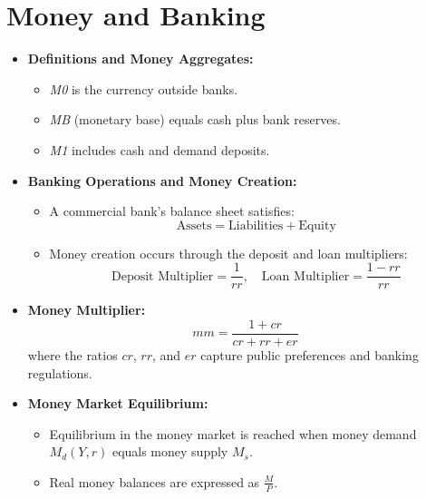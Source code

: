 \section*{Money and Banking}
\begin{itemize}
    \item \textbf{Definitions and Money Aggregates:}
    \begin{itemize}
        \item \emph{M0} is the currency outside banks.
        \item \emph{MB} (monetary base) equals cash plus bank reserves.
        \item \emph{M1} includes cash and demand deposits.
    \end{itemize}
    \item \textbf{Banking Operations and Money Creation:}
    \begin{itemize}
        \item A commercial bank’s balance sheet satisfies:
        \[
        \text{Assets} = \text{Liabilities} + \text{Equity}
        \]
        \item Money creation occurs through the deposit and loan multipliers:
        \[
        \text{Deposit Multiplier} = \frac{1}{rr}, \quad \text{Loan Multiplier} = \frac{1 - rr}{rr}
        \]
    \end{itemize}
    \item \textbf{Money Multiplier:}
    \[
    mm = \frac{1 + cr}{cr + rr + er}
    \]
    where the ratios \(cr\), \(rr\), and \(er\) capture public preferences and banking regulations.
    \item \textbf{Money Market Equilibrium:}
    \begin{itemize}
        \item Equilibrium in the money market is reached when money demand \(M_d(Y, r)\) equals money supply \(M_s\).
        \item Real money balances are expressed as \(\frac{M}{P}\).
    \end{itemize}
\end{itemize}

